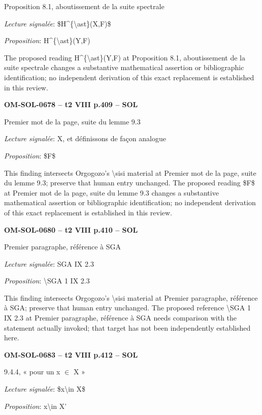 Proposition 8.1, aboutissement de la suite spectrale\par
\emph{Lecture signalée}: \$H\textasciicircum{}\{\textbackslash{}ast\}(X,F)\$\par
\emph{Proposition}: H\textasciicircum{}\{\textbackslash{}ast\}(Y,F)\par
The proposed reading H\textasciicircum{}\{\textbackslash{}ast\}(Y,F) at Proposition 8.1, aboutissement de la suite spectrale changes a substantive mathematical assertion or bibliographic identification; no independent derivation of this exact replacement is established in this review.\par
\par\noindent\textbf{OM-SOL-0678 -- t2 VIII p.409 -- SOL}\par
Premier mot de la page, suite du lemme 9.3\par
\emph{Lecture signalée}: X, et définissons de façon analogue\par
\emph{Proposition}: \$F\$\par
This finding intersects Orgogozo's \textbackslash{}sisi material at Premier mot de la page, suite du lemme 9.3; preserve that human entry unchanged. The proposed reading \$F\$ at Premier mot de la page, suite du lemme 9.3 changes a substantive mathematical assertion or bibliographic identification; no independent derivation of this exact replacement is established in this review.\par
\par\noindent\textbf{OM-SOL-0680 -- t2 VIII p.410 -- SOL}\par
Premier paragraphe, référence à SGA\par
\emph{Lecture signalée}: SGA IX 2.3\par
\emph{Proposition}: \textbackslash{}SGA 1 IX 2.3\par
This finding intersects Orgogozo's \textbackslash{}sisi material at Premier paragraphe, référence à SGA; preserve that human entry unchanged. The proposed reference \textbackslash{}SGA 1 IX 2.3 at Premier paragraphe, référence à SGA needs comparison with the statement actually invoked; that target has not been independently established here.\par
\par\noindent\textbf{OM-SOL-0683 -- t2 VIII p.412 -- SOL}\par
9.4.4, « pour un x \ensuremath{\in} X »\par
\emph{Lecture signalée}: \$x\textbackslash{}in X\$\par
\emph{Proposition}: x\textbackslash{}in X'\par
